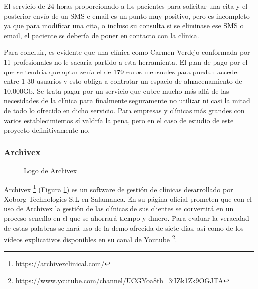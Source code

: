 El servicio de 24 horas proporcionado a los pacientes para solicitar una cita y el posterior envío de un SMS e email es un punto muy positivo, pero es incompleto ya que para modificar una cita, o incluso su consulta si se eliminase ese SMS o email, el paciente se debería de poner en contacto con la clínica.\bigskip

Para concluir, es evidente que una clínica como Carmen Verdejo conformada por 11 profesionales no le sacaría partido a esta herramienta. El plan de pago por el que se tendría que optar sería el de 179 euros mensuales para puedan acceder entre 1-30 usuarios y esto obliga a contratar un espacio de almacenamiento de 10.000Gb. Se trata pagar por un servicio que cubre mucho más allá de las necesidades de la clínica para finalmente seguramente no utilizar ni casi la mitad de todo lo ofrecido en dicho servicio. Para empresas y clínicas más grandes con varios establecimientos sí valdría la pena, pero en el caso de estudio de este proyecto definitivamente no.

\subsubsection*{Archivex}

\begin{figure}[H]
    \caption{Logo de Archivex}
    \label{fig:archivex-logo}
\end{figure}

 Archivex \footnote{\url{https://archivexclinical.com/}} (Figura \ref{fig:archivex-logo}) es un software de gestión de clínicas desarrollado por Xoborg Technologies S.L en Salamanca. En su página oficial prometen que con el uso de Archivex la gestión de las clínicas de sus clientes se convertirá en un proceso sencillo en el que se ahorrará tiempo y dinero. Para evaluar la veracidad de estas palabras se hará uso de la demo ofrecida de siete días, así como de los vídeos explicativos disponibles en su canal de Youtube \footnote{\url{https://www.youtube.com/channel/UCGYoa8th_3iIZk1Zk9OGJTA}}. \bigskip

